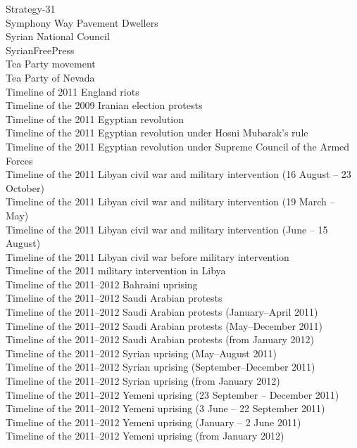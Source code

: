 Strategy-31\\
Symphony Way Pavement Dwellers\\
Syrian National Council\\
SyrianFreePress\\
Tea Party movement\\
Tea Party of Nevada\\
Timeline of 2011 England riots\\
Timeline of the 2009 Iranian election protests\\
Timeline of the 2011 Egyptian revolution\\
Timeline of the 2011 Egyptian revolution under Hosni Mubarak's rule\\
Timeline of the 2011 Egyptian revolution under Supreme Council of the Armed Forces\\
Timeline of the 2011 Libyan civil war and military intervention (16 August – 23 October)\\
Timeline of the 2011 Libyan civil war and military intervention (19 March – May)\\
Timeline of the 2011 Libyan civil war and military intervention (June – 15 August)\\
Timeline of the 2011 Libyan civil war before military intervention\\
Timeline of the 2011 military intervention in Libya\\
Timeline of the 2011–2012 Bahraini uprising\\
Timeline of the 2011–2012 Saudi Arabian protests\\
Timeline of the 2011–2012 Saudi Arabian protests (January–April 2011)\\
Timeline of the 2011–2012 Saudi Arabian protests (May–December 2011)\\
Timeline of the 2011–2012 Saudi Arabian protests (from January 2012)\\
Timeline of the 2011–2012 Syrian uprising (May–August 2011)\\
Timeline of the 2011–2012 Syrian uprising (September–December 2011)\\
Timeline of the 2011–2012 Syrian uprising (from January 2012)\\
Timeline of the 2011–2012 Yemeni uprising (23 September – December 2011)\\
Timeline of the 2011–2012 Yemeni uprising (3 June – 22 September 2011)\\
Timeline of the 2011–2012 Yemeni uprising (January – 2 June 2011)\\
Timeline of the 2011–2012 Yemeni uprising (from January 2012)\\
